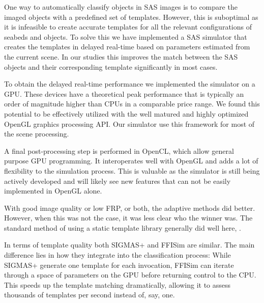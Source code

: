 One way to automatically classify objects in SAS images is to compare the imaged objects with a predefined set of templates. However, this is suboptimal as it is infeasible to create accurate templates for all the relevant configurations of seabeds and objects. To solve this we have implemented a SAS simulator that creates the templates in delayed real-time based on parameters estimated from the current scene. In our studies this improves the match between the SAS objects and their corresponding template significantly in most cases.

To obtain the delayed real-time performance we implemented the simulator on a GPU. These devices have a theoretical peak performance that is typically an order of magnitude higher than CPUs in a comparable price range. We found this potential to be effectively utilized with the well matured and highly optimized OpenGL graphics processing API. Our simulator use this framework for most of the scene processing.

A final post-processing step is performed in OpenCL, which allow general purpose GPU programming. It interoperates well with OpenGL and adds a lot of flexibility to the simulation process. This is valuable as the simulator is still being actively developed and will likely see new features that can not be easily implemented in OpenGL alone.

With good image quality or low FRP, or both, the adaptive methods did better. However, when this was not the case, it was less clear who the winner was. The standard method of using a static template library generally did well here, . 

In terms of template quality both SIGMAS+ and FFISim are similar. The main difference lies in how they integrate into the classification process: While SIGMAS+ generate one template for each invocation, FFISim can iterate through a space of parameters on the GPU before returning control to the CPU. This speeds up the template matching dramatically, allowing it to assess thousands of templates per second instead of, say, one. 
 
%

\ifPhdDoc
\clearpage
\appendix
\renewcommand\thesection{\Roman{section}}
\else
\appendices
\fi




